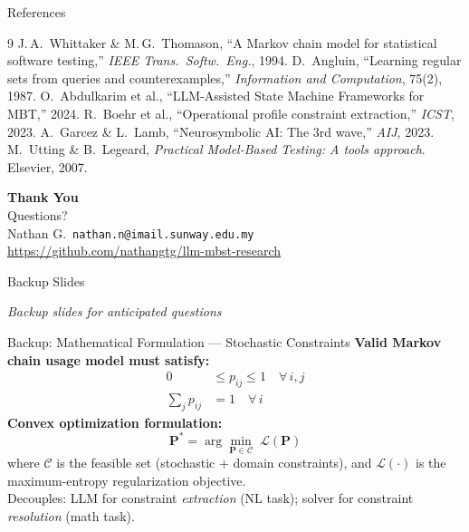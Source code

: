 \documentclass[aspectratio=169,10pt]{beamer}
\begin{document}
\begin{frame}{References}
  \begin{thebibliography}{9}
    \small
     J.\,A.\ Whittaker \& M.\,G.\ Thomason, ``A Markov chain model for statistical software testing,'' \textit{IEEE Trans.\ Softw.\ Eng.}, 1994.
     D.\ Angluin, ``Learning regular sets from queries and counterexamples,'' \textit{Information and Computation}, 75(2), 1987.
     O.\ Abdulkarim et al., ``LLM-Assisted State Machine Frameworks for MBT,'' 2024.
     R.\ Boehr et al., ``Operational profile constraint extraction,'' \textit{ICST}, 2023.
     A.\ Garcez \& L.\ Lamb, ``Neurosymbolic AI: The 3rd wave,'' \textit{AIJ}, 2023.
     M.\ Utting \& B.\ Legeard, \textit{Practical Model-Based Testing: A tools approach}. Elsevier, 2007.
  \end{thebibliography}
\end{frame}

\begin{frame}
  \begin{center}
    \vspace{1em}
    {\Large \textbf{Thank You}}\\[1em]
    {\large Questions?}\\[2em]
    \small
    Nathan G.\ \quad \texttt{nathan.n@imail.sunway.edu.my}\\[0.5em]
    \url{https://github.com/nathangtg/llm-mbst-research}
  \end{center}
\end{frame}

\appendix

\begin{frame}{Backup Slides}
  \begin{center}
    \textit{Backup slides for anticipated questions}
  \end{center}
\end{frame}

\begin{frame}{Backup: Mathematical Formulation — Stochastic Constraints}
  \textbf{Valid Markov chain usage model must satisfy:}
  \begin{align}
    0 &\leq p_{ij} \leq 1 \quad \forall\, i,j \label{eq:prob_bounds} \\
    \sum_{j} p_{ij} &= 1 \quad \forall\, i \label{eq:row_stochastic}
  \end{align}
  \textbf{Convex optimization formulation:}
  \[ \mathbf{P}^{*} = \arg\min_{\mathbf{P} \in \mathcal{C}}\; \mathcal{L}(\mathbf{P}) \]
  where $\mathcal{C}$ is the feasible set (stochastic + domain constraints), and $\mathcal{L}(\cdot)$ is the maximum-entropy regularization objective.\\[6pt]
  Decouples: LLM for constraint \emph{extraction} (NL task); solver for constraint \emph{resolution} (math task).
\end{frame}
\end{document}
